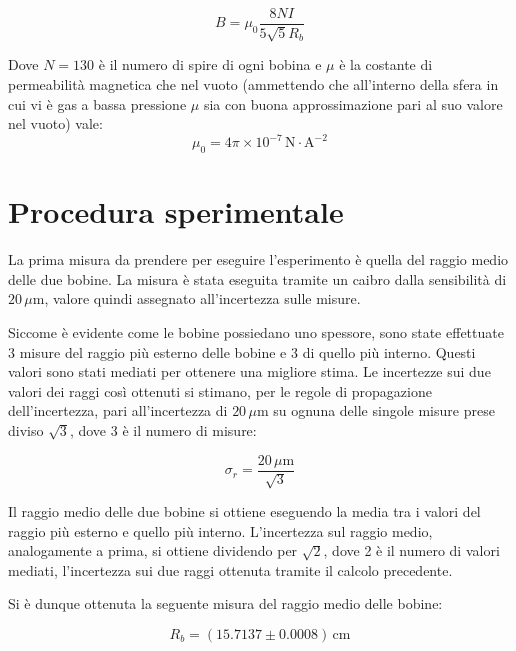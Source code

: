 \documentclass[a4paper,12pt]{article}
\begin{document}
\begin{equation}
    B = \mu_0 \frac{8NI}{5\sqrt{5} R_b}
    \label{eq:campo_magnetico}
\end{equation}

Dove \( N = 130 \) è il numero di spire di ogni bobina e \( \mu \) è la costante di permeabilità magnetica che nel vuoto (ammettendo che all’interno della sfera in cui vi è gas a bassa pressione \( \mu \) sia con buona approssimazione pari al suo valore nel vuoto) vale:
\begin{equation}
    \mu_0 = 4 \pi \times 10^{-7} \, \text{N} \cdot \text{A}^{-2}
    \label{eq:permeabilita_magnetica}
\end{equation}

\section{Procedura sperimentale}

La prima misura da prendere per eseguire l’esperimento è quella del raggio medio delle due bobine. La misura è stata eseguita tramite un caibro dalla sensibilità di \( 20 \, \mu\text{m} \), valore quindi assegnato all’incertezza sulle misure.

Siccome è evidente come le bobine possiedano uno spessore, sono state effettuate 3 misure del raggio più esterno delle bobine e 3 di quello più interno. Questi valori sono stati mediati per ottenere una migliore stima. Le incertezze sui due valori dei raggi così ottenuti si stimano, per le regole di propagazione dell’incertezza, pari all’incertezza di \( 20 \, \mu\text{m} \) su ognuna delle singole misure prese diviso \( \sqrt{3} \), dove 3 è il numero di misure:

\begin{equation}
    \sigma_r = \frac{20 \, \mu\text{m}}{\sqrt{3}}
    \label{eq:incertezza_raggi}
\end{equation}

Il raggio medio delle due bobine si ottiene eseguendo la media tra i valori del raggio più esterno e quello più interno. L’incertezza sul raggio medio, analogamente a prima, si ottiene dividendo per \( \sqrt{2} \), dove 2 è il numero di valori mediati, l’incertezza sui due raggi ottenuta tramite il calcolo precedente.

Si è dunque ottenuta la seguente misura del raggio medio delle bobine:

\begin{equation}
    R_b = (15.7137 \pm 0.0008) \, \text{cm}
    \label{eq:raggio_medio_bobine}
\end{equation}
\end{document}
